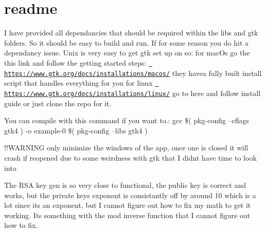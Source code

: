 \chapter{readme}
\hypertarget{md_readme}{}\label{md_readme}
I have provided all dependancies that should be required within the libs and gtk folders. So it should be easy to build and run. If for some reason you do hit a dependancy issue. Unix is very easy to get gtk set up on so\+: for mac\+Os go the this link and follow the getting started steps\+: \href{https://www.gtk.org/docs/installations/macos/}{\texttt{ https\+://www.\+gtk.\+org/docs/installations/macos/}} they havea fully built install script that handles everything for you for linux \href{https://www.gtk.org/docs/installations/linux/}{\texttt{ https\+://www.\+gtk.\+org/docs/installations/linux/}} go to here and follow install guide or just clone the repo for it.

You can compile with this command if you want to.\+: gcc \$( pkg-\/config --cflags gtk4 ) -\/o example-\/0  \$( pkg-\/config --libs gtk4 )

!!\+WARNING only minimize the windows of the app, once one is closed it will crash if reopened due to some weirdness with gtk that I didn\textquotesingle{}t have time to look into

The RSA key gen is so very close to functional, the public key is correct and works, but the private key\textquotesingle{}s exponent is consistantly off by around 10 which is a lot since its an exponent, but I cannot figure out how to fix my math to get it working. Its something with the mod inverse function that I cannot figure out how to fix. 